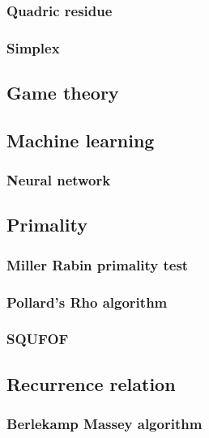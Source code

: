 \documentclass[titlepage,a4paper,10pt]{article}
\begin{document}
\begin{multicols}{2}
\begin{spacing}{0.8}
{				\subsubsection{Quadric residue}
					
				\subsubsection{Simplex}
					
			\subsection{Game theory}
				
			\subsection{Machine learning}
				\subsubsection{Neural network}
					
			\subsection{Primality}
				\subsubsection{Miller Rabin primality test}
					
				\subsubsection{Pollard's Rho algorithm}
					
				\subsubsection{SQUFOF}
					
			\subsection{Recurrence relation}
				\subsubsection{Berlekamp Massey algorithm}
					
}
\end{spacing}
\end{multicols}
\end{document}
